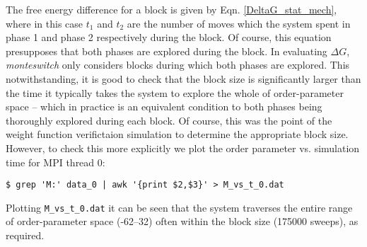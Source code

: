 \documentclass{report}
\begin{document}
The free energy difference for a block is given by Eqn. \eqref{DeltaG_stat_mech}, where in this case $t_1$ and $t_2$ are the number of moves which the 
system spent in phase 1 and phase 2 respectively during the block. Of course, this equation presupposes that both phases are explored during the block. 
In evaluating $\Delta G$, \emph{monteswitch} only considers blocks during which both phases are explored. This notwithstanding, it is good to check that
the block size is significantly larger than the time it typically takes the system to explore the whole of order-parameter space -- which in practice
is an equivalent condition to both phases being thoroughly explored during each block. Of course, this was the point of the weight function verifictaion
simulation to determine the appropriate block size. However, to check this more explicitly we plot the order parameter vs. simulation time for MPI thread 0:
\begin{verbatim}
$ grep 'M:' data_0 | awk '{print $2,$3}' > M_vs_t_0.dat
\end{verbatim}
Plotting \texttt{M\_vs\_t\_0.dat} it can be seen that the system traverses the entire range of order-parameter space (-62--32) often within the block size 
(175000 sweeps), as required.







\end{document}
